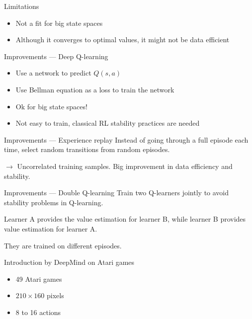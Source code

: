 \begin{frame}{Limitations}
  \begin{itemize}[<+->]
    \item Not a fit for big state spaces
    \item Although it converges to optimal values, it might not be data efficient
  \end{itemize}
\end{frame}

\begin{frame}{Improvements --- Deep Q-learning}
  \begin{itemize}[<+->]
    \item Use a network to predict $Q(s, a)$
    \item Use Bellman equation as a loss to train the network
    \item Ok for big state spaces!
    \item Not easy to train, classical RL stability practices are needed
  \end{itemize}
\end{frame}

\begin{frame}{Improvements --- Experience replay}
  Instead of going through a full episode each time, select random transitions from random episodes.

  $\rightarrow$ Uncorrelated training samples. Big improvement in data efficiency and stability.
\end{frame}

\begin{frame}{Improvements --- Double Q-learning}
  Train two Q-learners jointly to avoid stability problems in Q-learning.

  Learner A provides the value estimation for learner B, while learner B provides value estimation for learner A.

  They are trained on different episodes.
\end{frame}

\begin{frame}{Introduction by DeepMind on Atari games}
  \begin{itemize}
  \item 49 Atari games
  \item $210 \times 160$ pixels
  \item 8 to 16 actions
  \end{itemize}
\end{frame}

